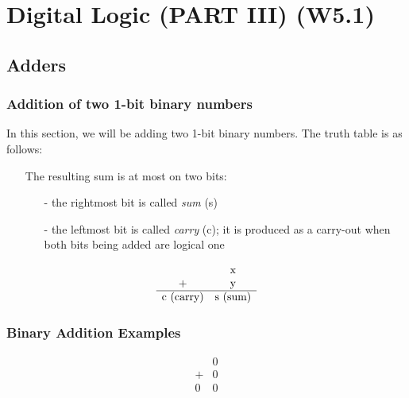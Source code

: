 \documentclass[12pt,openany]{book}
\begin{document}
			      	
			      	
			      	\chapter{Digital Logic (PART III) (W5.1)}
			      	\section{Adders}
			      	\subsection{Addition of two 1-bit binary numbers}
			      	In this section, we will be adding two 1-bit binary numbers. The truth table is as follows:
			      	\begin{itemize}
			      		\item[] The resulting sum is at most on two bits:
			      		      \begin{itemize}
			      		      	\item[-] the rightmost bit is called \textit{sum} (s)
			      		      	\item[-] the leftmost bit is called \textit{carry} (c); it is produced as a carry-out when both bits being added are logical one
			      		      \end{itemize}
			      	\end{itemize}
			      	
			      	
			      	\[
			      		\begin{array}{cccccc}
			      			            & $x$       \\
			      			+           & $y$       \\
			      			\hline
			      			$c (carry)$ & $s (sum)$ \\
			      		\end{array}
			      	\]
			      	    
			      	\subsection{Binary Addition Examples}
			      	


					\[
					\begin{array}{cccccc}
					& 0 \\
					+ & 0 \\
					\hline
					0 & 0 \\
					\end{array}
					\]
					
\end{document}
